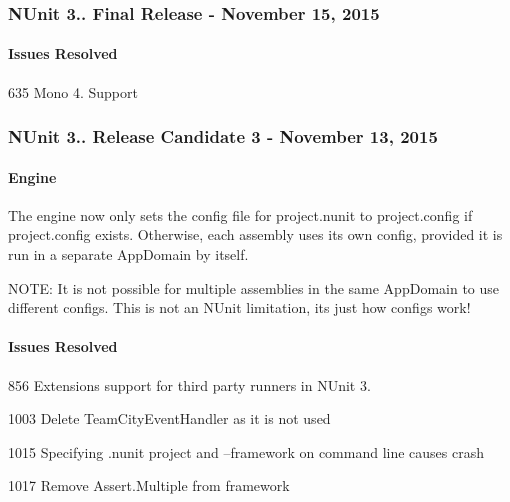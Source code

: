 \subsubsection*{N\+Unit 3.. Final Release -\/ November 15, 2015}

\paragraph*{Issues Resolved}


\begin{DoxyItemize}
\item 635 Mono 4. Support
\end{DoxyItemize}

\subsubsection*{N\+Unit 3.. Release Candidate 3 -\/ November 13, 2015}

\paragraph*{Engine}


\begin{DoxyItemize}
\item The engine now only sets the config file for project.\+nunit to project.\+config if project.\+config exists. Otherwise, each assembly uses its own config, provided it is run in a separate App\+Domain by itself.

N\+O\+TE\+: It is not possible for multiple assemblies in the same App\+Domain to use different configs. This is not an N\+Unit limitation, it\textquotesingle{}s just how configs work!
\end{DoxyItemize}

\paragraph*{Issues Resolved}


\begin{DoxyItemize}
\item 856 Extensions support for third party runners in N\+Unit 3.
\item 1003 Delete Team\+City\+Event\+Handler as it is not used
\item 1015 Specifying .nunit project and --framework on command line causes crash
\item 1017 Remove Assert.\+Multiple from framework
\end{DoxyItemize}

